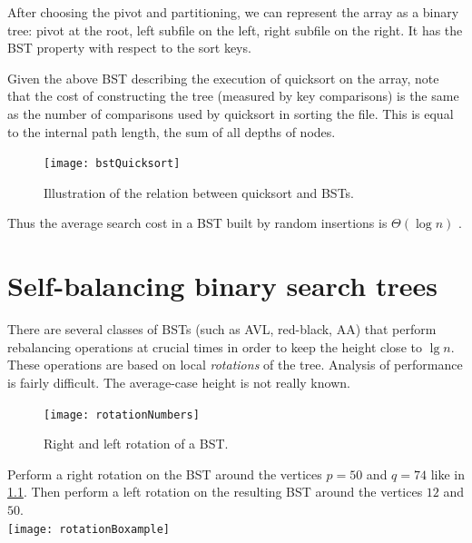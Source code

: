 After choosing the pivot and partitioning, we can represent the array as a 
binary tree: pivot at the root, left subfile on the left, right subfile on the 
right. It has the BST property with respect to the sort keys.

Given the above BST describing the execution of quicksort on the array, 
note that the cost of constructing the tree (measured by key comparisons) is 
the same as the number of comparisons used by quicksort in sorting the file.
This is equal to the {internal path length}, the sum of all depths of nodes.

\begin{figure}[htb]
  \centering
  \texttt{[image: bstQuicksort]}
  \caption{Illustration of the relation between quicksort and BSTs.}
  \label{fig:bstQuicksort}
\end{figure}

Thus the average search cost in a BST built by random insertions is $\Theta(\log n)$ .






\chapter{Self-balancing binary search trees} %
\label{sec:balanced}

There are several classes of BSTs (such as AVL, red-black, AA) that 
perform rebalancing operations at crucial times in order to keep the height 
close to $\lg n$.
These operations are based on local \emph{rotations} of the tree.
Analysis of performance is fairly difficult.
The average-case height is not really known.

\begin{figure}[htb]
  \centering
  \texttt{[image: rotationNumbers]}
  \caption{Right and left rotation of a BST.}
  \label{fig:rotation}
\end{figure} 

\begin{Boxample}[7]
Perform a right rotation on the BST around the vertices $p = 50$ and $q = 74$ like in \cref{fig:rotation}.
Then perform a left rotation on the resulting BST around the vertices $12$ and $50$.\\
\newline 
\texttt{[image: rotationBoxample]}
\end{Boxample}


